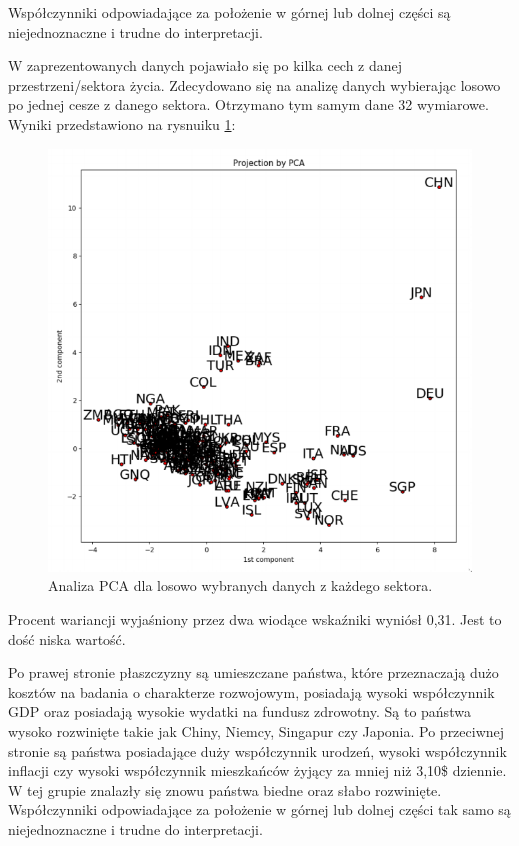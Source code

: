 \documentclass{article}
\begin{document}
Współczynniki odpowiadające za położenie w górnej lub dolnej części są niejednoznaczne i trudne do interpretacji.

W zaprezentowanych danych pojawiało się po kilka cech z danej przestrzeni/sektora życia. Zdecydowano się na analizę danych wybierając losowo po
jednej cesze z danego sektora.
Otrzymano tym samym dane 32 wymiarowe. Wyniki przedstawiono na rysnuiku \ref{fig:5_PCA_partial}:

\begin{figure}[h!]
\begin{center}
\includegraphics[width=5 in]{Pictures/5_PCA_parital.png}
\end{center}
\captionsetup{justification=centering}
\caption{Analiza PCA dla losowo wybranych danych z każdego sektora.}
\label{fig:5_PCA_partial}
\end{figure}


Procent wariancji wyjaśniony przez dwa wiodące wskaźniki wyniósł 0,31.
Jest to dość niska wartość.

Po prawej stronie płaszczyzny są umieszczane państwa, które przeznaczają dużo kosztów na badania o
charakterze rozwojowym, posiadają wysoki współczynnik GDP oraz posiadają wysokie wydatki na fundusz zdrowotny.
Są to państwa wysoko rozwinięte takie jak Chiny, Niemcy, Singapur czy Japonia.
Po przeciwnej stronie są państwa posiadające duży współczynnik urodzeń, wysoki współczynnik inflacji
czy wysoki współczynnik mieszkańców żyjący za mniej niż 3,10\$ dziennie.
W tej grupie znalazły się znowu państwa biedne oraz słabo rozwinięte.
Współczynniki odpowiadające za położenie w górnej lub dolnej części tak samo są niejednoznaczne i trudne do interpretacji.
\end{document}
